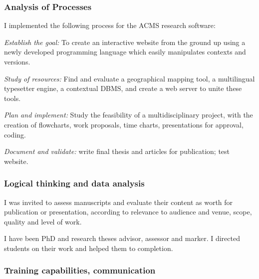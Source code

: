 \hspace*{0.6cm}
\begin{minipage}{0.50\textwidth}

\subsubsection*{Analysis of Processes}
\vspace*{-0.2cm}

I implemented the following process
for the ACMS research software:

\vspace*{.1cm}
{\it Establish the goal:} To create an interactive website from the ground up
using a newly developed programming language which easily manipulates
contexts and versions. 
\vspace*{.1cm}

{\it Study of resources:} Find and evaluate
a geographical mapping tool,
a multilingual typesetter engine,
a contextual DBMS,
and
create a web server
to unite these tools.
\vspace*{.1cm}

{\it Plan and implement:} Study the feasibility of a
multidisciplinary project, with the creation of
flowcharts, work proposals,
time charts, 
presentations for approval,
coding.%
\vspace*{.1cm}

{\it Document and validate:} write final thesis and articles for
publication; test website.

\subsubsection*{Logical thinking and data analysis}
\vspace*{-0.2cm}


I was invited to assess manuscripts and
evaluate their content as worth for publication or presentation, according
to relevance to audience and venue, scope, quality and level of work. 

\vspace*{.1cm}

I have been PhD and research theses advisor, assessor and marker.
I directed students on their work and helped them to completion.




\subsubsection*{Training capabilities, communication}
\vspace*{-0.2cm}


\end{minipage}

